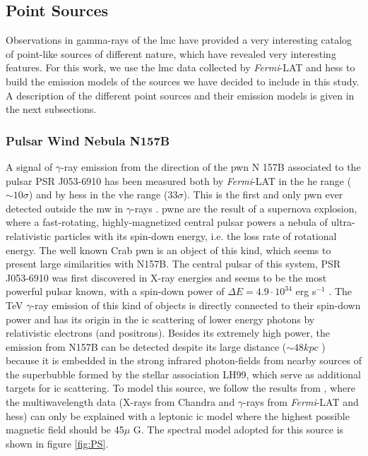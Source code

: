 \documentclass[main.tex]{subfiles}
\begin{document}
\subsection{Point Sources}\label{sec:point}

Observations in gamma-rays of the \gls{lmc} have provided a very interesting catalog of point-like sources of different nature, which have revealed very interesting features. For this work, we use the \gls{lmc} data collected by \textit{Fermi}-LAT \cite{2010FermiLATLMC11months} \cite{2016LMCFermiLAT} and \gls{hess} \cite{2012HESSLMC} \cite{2015HESSTeVLMC} \cite{2017HESSLMCP3} to build the emission models of the sources we have decided to include in this study. A description of the different point sources and their emission models is given in the next subsections.

\subsubsection{Pulsar Wind Nebula N157B}

A signal of $\gamma$-ray emission from the direction of the \gls{pwn} N 157B associated to the pulsar  PSR J053-6910 has been measured both by \textit{Fermi}-LAT in the \gls{he} range ($\sim 10 \sigma$) and by \gls{hess} in the \gls{vhe} range ($33 \sigma$). This is the first and only \gls{pwn} ever detected outside the \gls{mw} in $\gamma$-rays \cite{2012HESSN157B}. \gls{pwne} are the result of a supernova explosion, where a fast-rotating, highly-magnetized central pulsar powers a nebula of ultra-relativistic particles with its spin-down energy, i.e. the loss rate of rotational energy. The well known Crab \gls{pwn} is an object of this kind, which seems to present large similarities with N157B. The central pulsar of this system, PSR J053-6910 was first discovered in X-ray energies and seems to be the most powerful pulsar known, with a spin-down power of $\Delta E = 4.9 \cdot 10^{34} $ erg s$^{-1}$ \cite{1998PulsarN157B}. The TeV $\gamma$-ray emission of this kind of objects is directly connected to their spin-down power and has its origin in the \gls{ic} scattering of lower energy photons by relativistic electrons (and positrons). Besides its extremely high power, the emission from N157B can be detected despite its large distance ($\sim 48 kpc$ \cite{2006N157Bdistance}) because it is embedded in the strong infrared photon-fields from nearby sources of the superbubble formed by the stellar association LH99, which serve as additional targets for \gls{ic} scattering.
To model this source, we follow the results from \cite{2015HESSTeVLMC}, where the multiwavelength data (X-rays from Chandra \cite{2001ChandraN157B} and $\gamma$-rays from \textit{Fermi}-LAT and \gls{hess}) can only be explained with a leptonic \gls{ic} model where the highest possible magnetic field should be 45$\mu$ G. The  spectral model adopted for this source is shown in figure \ref{fig:PS}.
\end{document}
